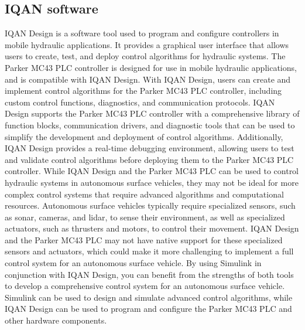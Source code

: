 \documentclass{article}
\begin{document}
\subsection{IQAN software}
IQAN Design is a software tool used to program and configure controllers in mobile hydraulic applications. It provides a graphical user interface that allows users to create, test, and deploy control algorithms for hydraulic systems. The Parker MC43 PLC controller is designed for use in mobile hydraulic applications, and is compatible with IQAN Design. With IQAN Design, users can create and implement control algorithms for the Parker MC43 PLC controller, including custom control functions, diagnostics, and communication protocols. IQAN Design supports the Parker MC43 PLC controller with a comprehensive library of function blocks, communication drivers, and diagnostic tools that can be used to simplify the development and deployment of control algorithms. Additionally, IQAN Design provides a real-time debugging environment, allowing users to test and validate control algorithms before deploying them to the Parker MC43 PLC controller. While IQAN Design and the Parker MC43 PLC can be used to control hydraulic systems in autonomous surface vehicles, they may not be ideal for more complex control systems that require advanced algorithms and computational resources. Autonomous surface vehicles typically require specialized sensors, such as sonar, cameras, and lidar, to sense their environment, as well as specialized actuators, such as thrusters and motors, to control their movement. IQAN Design and the Parker MC43 PLC may not have native support for these specialized sensors and actuators, which could make it more challenging to implement a full control system for an autonomous surface vehicle. By using Simulink in conjunction with IQAN Design, you can benefit from the strengths of both tools to develop a comprehensive control system for an autonomous surface vehicle. Simulink can be used to design and simulate advanced control algorithms, while IQAN Design can be used to program and configure the Parker MC43 PLC and other hardware components.
\end{document}
